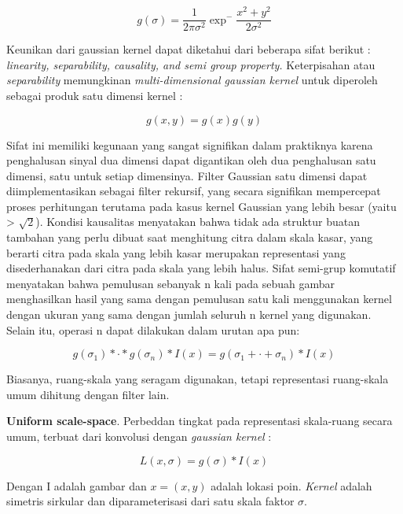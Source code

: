\begin{equation*}
g(\sigma) = \frac{1}{2\pi\sigma^2}\exp^-\frac{x^2+y^2}{2\sigma^2}
\end{equation*}

Keunikan dari gaussian kernel dapat diketahui dari beberapa sifat berikut : 
\emph{linearity, separability, causality, and semi group property.} Keterpisahan 
atau \emph{separability} memungkinan \emph{multi-dimensional gaussian kernel} 
untuk diperoleh sebagai produk satu dimensi kernel : 

\begin{equation*}
  g(x,y) = g(x)g(y)
\end{equation*}

Sifat ini memiliki kegunaan yang sangat signifikan dalam praktiknya karena penghalusan sinyal dua dimensi 
dapat digantikan oleh dua penghalusan satu dimensi, satu untuk setiap dimensinya. 
Filter Gaussian satu dimensi dapat diimplementasikan sebagai filter rekursif, yang secara signifikan mempercepat proses 
perhitungan terutama pada kasus kernel Gaussian yang lebih besar (yaitu > \( \sqrt{2}\)). 
Kondisi kausalitas menyatakan bahwa tidak ada struktur buatan tambahan yang perlu dibuat saat menghitung citra dalam skala kasar, 
yang berarti citra pada skala yang lebih kasar merupakan representasi yang disederhanakan dari citra pada skala yang lebih halus. 
Sifat semi-grup komutatif menyatakan bahwa pemulusan sebanyak n kali pada sebuah gambar menghasilkan hasil yang sama dengan pemulusan satu kali 
menggunakan kernel dengan ukuran yang sama dengan jumlah seluruh n kernel yang digunakan. 
Selain itu, operasi n dapat dilakukan dalam urutan apa pun:

\begin{equation*}
g(\sigma_{1}) * \cdot * g(\sigma_{n}) * I(x) = g(\sigma_{1} + \cdot + \sigma_{n}) * I(x)
\end{equation*}

Biasanya, ruang-skala yang seragam digunakan, tetapi representasi ruang-skala umum dihitung dengan filter lain.

\textbf{Uniform scale-space}. Perbeddan tingkat pada representasi skala-ruang
secara umum, terbuat dari konvolusi dengan \emph{gaussian kernel} :

\begin{equation*}
L(x,\sigma) = g(\sigma) * I(x)
\end{equation*}

Dengan I adalah gambar dan \(x = (x,y)\) adalah lokasi poin.
\emph{Kernel} adalah simetris sirkular dan diparameterisasi dari satu skala faktor \(\sigma \).

